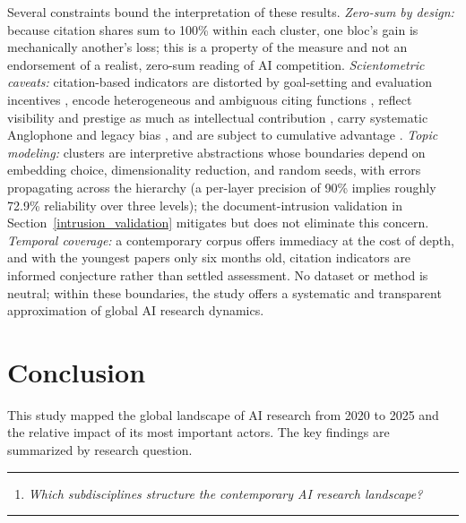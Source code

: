 \documentclass{article}
\let\cite\parencite
\begin{document}
	Several constraints bound the interpretation of these results. \textit{Zero-sum by design:} because citation shares sum to 100\% within each cluster, one bloc's gain is mechanically another's loss; this is a property of the measure and not an endorsement of a realist, zero-sum reading of AI competition. \textit{Scientometric caveats:} citation-based indicators are distorted by goal-setting and evaluation incentives \cite{baccini2019citation, fire2018over}, encode heterogeneous and ambiguous citing functions \cite{adler2009citation, waltman2016review}, reflect visibility and prestige as much as intellectual contribution \cite{waltman2016review}, carry systematic Anglophone and legacy bias \cite{Maddi2025GeographicalDisciplinaryCoverage, gomez2022leading}, and are subject to cumulative advantage \cite{wang2013quantifying, lariviere2009impact}. \textit{Topic modeling:} clusters are interpretive abstractions whose boundaries depend on embedding choice, dimensionality reduction, and random seeds, with errors propagating across the hierarchy (a per-layer precision of 90\% implies roughly 72.9\% reliability over three levels); the document-intrusion validation in Section~\ref{intrusion_validation} mitigates but does not eliminate this concern. \textit{Temporal coverage:} a contemporary corpus offers immediacy at the cost of depth, and with the youngest papers only six months old, citation indicators are informed conjecture rather than settled assessment. No dataset or method is neutral; within these boundaries, the study offers a systematic and transparent approximation of global AI research dynamics.
	
	\section{Conclusion}
	
	This study mapped the global landscape of AI research from 2020 to 2025 and the relative impact of its most important actors. The key findings are summarized by research question.
	
	\vspace{1em}
	\rule{\linewidth}{0.4pt}
	\begin{enumerate}
		\item[\textbf{RQ1}]\hspace*{2em}\parbox[t]{\dimexpr\linewidth-2em}{
			\textit{Which subdisciplines structure the contemporary AI research landscape?}
		}
	\end{enumerate}
	\vspace{0.25em}
	\rule{\linewidth}{0.4pt}
	\vspace{1em}
	
\end{document}
